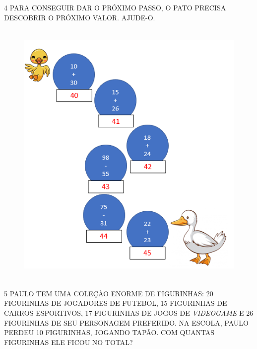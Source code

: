 \num{4} PARA CONSEGUIR DAR O PRÓXIMO PASSO, O PATO PRECISA DESCOBRIR O PRÓXIMO VALOR. AJUDE-O.



\begin{figure}[htpb!]
\includegraphics[width=4.84443in,height=5.24031in]{media/image17.png}
\end{figure}

\num{5} PAULO TEM UMA COLEÇÃO ENORME DE FIGURINHAS: 20 FIGURINHAS DE
JOGADORES DE FUTEBOL, 15 FIGURINHAS DE CARROS ESPORTIVOS, 17 FIGURINHAS
DE JOGOS DE \textit{VIDEOGAME} E 26 FIGURINHAS DE SEU PERSONAGEM
PREFERIDO. NA ESCOLA, PAULO PERDEU 10 FIGURINHAS, JOGANDO TAPÃO. COM
QUANTAS FIGURINHAS ELE FICOU NO TOTAL?


